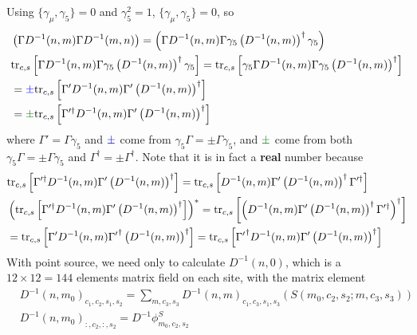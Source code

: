 Using $\{\gamma _{\mu},\gamma _5\}=0$ and $\gamma _5^2=1$, $\{\gamma _{\mu},\gamma _5\}=0$, so
\begin{equation}
\begin{split}
&\left(\Gamma D^{-1}(n,m)\Gamma D^{-1}(m,n)\right)=\left(\Gamma D^{-1}(n,m) \Gamma \gamma _5 \left(D^{-1}(n,m)\right)^{\dagger}\gamma _5\right)\\
&{\rm tr}_{c,s}\left[\Gamma D^{-1}(n,m) \Gamma \gamma _5 \left(D^{-1}(n,m)\right)^{\dagger}\gamma _5\right]={\rm tr}_{c,s}\left[\gamma _5\Gamma D^{-1}(n,m) \Gamma \gamma _5 \left(D^{-1}(n,m)\right)^{\dagger}\right]\\
&=\textcolor[rgb]{0,0,1}{\pm} {\rm tr}_{c,s}\left[\Gamma' D^{-1}(n,m) \Gamma' \left(D^{-1}(n,m)\right)^{\dagger}\right]\\
&=\textcolor[rgb]{0,0.5,0}{\pm} {\rm tr}_{c,s}\left[\Gamma'^{\dagger} D^{-1}(n,m) \Gamma' \left(D^{-1}(n,m)\right)^{\dagger}\right]\\
\end{split}
\end{equation}
where \textcolor[rgb]{0,0,1}{$\Gamma ' = \Gamma \gamma _5$} and $\textcolor[rgb]{0,0,1}{\pm}$ come from $\gamma _5\Gamma=\pm \Gamma \gamma _5$, and $\textcolor[rgb]{0,0.5,0}{\pm}$ come from both $\gamma _5\Gamma=\pm \Gamma \gamma _5$ and $\Gamma ^{\dagger}=\pm \Gamma ^{\dagger}$. Note that it is in fact a \textbf{real} number because
\begin{equation}
\begin{split}
&{\rm tr}_{c,s}\left[\Gamma'^{\dagger} D^{-1}(n,m) \Gamma' \left(D^{-1}(n,m)\right)^{\dagger}\right]={\rm tr}_{c,s}\left[D^{-1}(n,m) \Gamma' \left(D^{-1}(n,m)\right)^{\dagger}\Gamma'^{\dagger} \right]\\
&\left({\rm tr}_{c,s}\left[\Gamma'^{\dagger} D^{-1}(n,m) \Gamma' \left(D^{-1}(n,m)\right)^{\dagger}\right]\right)^*={\rm tr}_{c,s}\left[\left(D^{-1}(n,m) \Gamma' \left(D^{-1}(n,m)\right)^{\dagger}\Gamma'^{\dagger} \right)^{\dagger}\right]\\
&={\rm tr}_{c,s}\left[\Gamma' D^{-1}(n,m) {\Gamma'}^{\dagger} \left(D^{-1}(n,m)\right)^{\dagger}\right]={\rm tr}_{c,s}\left[{\Gamma'}^{\dagger} D^{-1}(n,m) \Gamma' \left(D^{-1}(n,m)\right)^{\dagger}\right]
\end{split}
\end{equation}
With point source, we need only to calculate $D^{-1}(n,0)$, which is a $12\times 12=144$ elements matrix field on each site, with the matrix element
\begin{equation}
\begin{split}
&D^{-1}(n,m_0)_{c_1,c_2,s_1,s_2}=\sum _{m,c_3,s_3}D^{-1}(n,m)_{c_1,c_3,s_1,s_3}\left(S(m_0,c_2,s_2;m,c_3,s_3)\right)\\
&D^{-1}(n,m_0)_{:,c_2,:,s_2}=D^{-1} \phi ^{S}_{m_0,c_2,s_2}\\
\end{split}
\end{equation}

